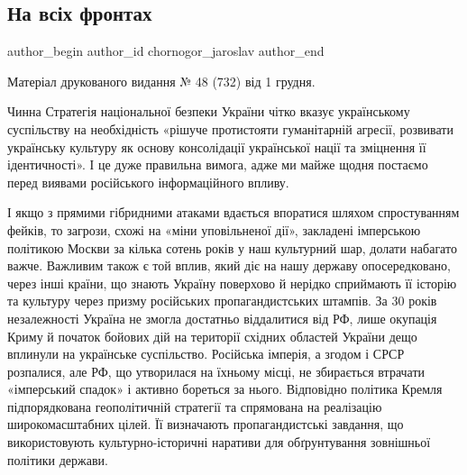  
 
 
 
 
\subsection{На всіх фронтах}
\label{sec:06_12_2021.stz.news.ua.tyzhden.1.na_vsih_frontah}

\ifcmt
 author_begin
   author_id chornogor_jaroslav
 author_end
\fi

Матеріал друкованого видання № 48 (732) від 1 грудня.


Чинна Стратегія національної безпеки України чітко вказує українському
суспільству на необхідність «рішуче протистояти гуманітарній агресії, розвивати
українську культуру як основу консолідації української нації та зміцнення її
ідентичності». І це дуже правильна вимога, адже ми майже щодня постаємо перед
виявами російського інформаційного впливу. 


І якщо з прямими гібридними атаками вдається впоратися шляхом спростуванням
фейків, то загрози, схожі на «міни уповільненої дії», закладені імперською
політикою Москви за кілька сотень років у наш культурний шар, долати набагато
важче. Важливим також є той вплив, який діє на нашу державу опосередковано,
через інші країни, що знають Україну поверхово й нерідко сприймають її історію
та культуру через призму російських пропагандистських штампів. За 30 років
незалежності Україна не змогла достатньо віддалитися від РФ, лише окупація
Криму й початок бойових дій на території східних областей України дещо вплинули
на українське суспільство. Російська імперія, а згодом і СРСР розпалися, але
РФ, що утворилася на їхньому місці, не збирається втрачати «імперський спадок»
і активно бореться за нього. Відповідно політика Кремля підпорядкована
геополітичній стратегії та спрямована на реалізацію широкомасштабних цілей. Її
визначають пропагандистські завдання, що використовують культурно-історичні
наративи для обґрунтування зовнішньої політики держави.

